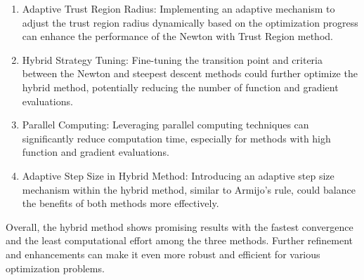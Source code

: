 \documentclass{article} %
\theoremstyle{definition}
\theoremstyle{remark}
\theoremstyle{plain}
\begin{document}
    \begin{enumerate}
        \item Adaptive Trust Region Radius: Implementing an adaptive mechanism to adjust the trust region radius dynamically based on the optimization progress can enhance the performance of the Newton with Trust Region method.
        \item Hybrid Strategy Tuning: Fine-tuning the transition point and criteria between the Newton and steepest descent methods could further optimize the hybrid method, potentially reducing the number of function and gradient evaluations.
        \item Parallel Computing: Leveraging parallel computing techniques can significantly reduce computation time, especially for methods with high function and gradient evaluations.
        \item Adaptive Step Size in Hybrid Method: Introducing an adaptive step size mechanism within the hybrid method, similar to Armijo's rule, could balance the benefits of both methods more effectively.
    \end{enumerate}
    
    Overall, the hybrid method shows promising results with the fastest convergence and the least computational effort among the three methods. Further refinement and enhancements can make it even more robust and efficient for various optimization problems.
\end{document}

